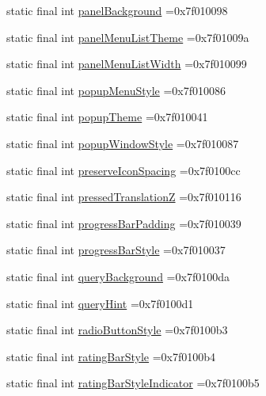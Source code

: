 \begin{DoxyCompactItemize}
static final int \hyperlink{classproject4_1_1xaria_1_1R_1_1attr_a49879ea588b3ac92fd5d8cbaed579fb3}{panel\+Background} =0x7f010098
\item 
static final int \hyperlink{classproject4_1_1xaria_1_1R_1_1attr_a8c926f3ce59f968aaa39ef0665562f9e}{panel\+Menu\+List\+Theme} =0x7f01009a
\item 
static final int \hyperlink{classproject4_1_1xaria_1_1R_1_1attr_acbeba7aa62e7528b101a89409abe2992}{panel\+Menu\+List\+Width} =0x7f010099
\item 
static final int \hyperlink{classproject4_1_1xaria_1_1R_1_1attr_afb866473cf6d66314b30642709afb1b5}{popup\+Menu\+Style} =0x7f010086
\item 
static final int \hyperlink{classproject4_1_1xaria_1_1R_1_1attr_a06bffca943d147734a40eb273589957d}{popup\+Theme} =0x7f010041
\item 
static final int \hyperlink{classproject4_1_1xaria_1_1R_1_1attr_a4fe6f821e3a9aba22e4cb5278fb94510}{popup\+Window\+Style} =0x7f010087
\item 
static final int \hyperlink{classproject4_1_1xaria_1_1R_1_1attr_a06451c64c4676512519c046c6f5e065b}{preserve\+Icon\+Spacing} =0x7f0100cc
\item 
static final int \hyperlink{classproject4_1_1xaria_1_1R_1_1attr_a572181f7a9e6b352ad203e9196c6a291}{pressed\+TranslationZ} =0x7f010116
\item 
static final int \hyperlink{classproject4_1_1xaria_1_1R_1_1attr_a371d550d06ea30a134c7549ea10a1718}{progress\+Bar\+Padding} =0x7f010039
\item 
static final int \hyperlink{classproject4_1_1xaria_1_1R_1_1attr_ad78b5154b765134ed406f888a1da6534}{progress\+Bar\+Style} =0x7f010037
\item 
static final int \hyperlink{classproject4_1_1xaria_1_1R_1_1attr_a84167c3d8a228a78b735c0f672d92e41}{query\+Background} =0x7f0100da
\item 
static final int \hyperlink{classproject4_1_1xaria_1_1R_1_1attr_ab087e93a83625f6b1721962d4c375609}{query\+Hint} =0x7f0100d1
\item 
static final int \hyperlink{classproject4_1_1xaria_1_1R_1_1attr_a34339d90503bd8a083f82ef72df0c319}{radio\+Button\+Style} =0x7f0100b3
\item 
static final int \hyperlink{classproject4_1_1xaria_1_1R_1_1attr_a33c3ad766e4d2d67648a41649dade84b}{rating\+Bar\+Style} =0x7f0100b4
\item 
static final int \hyperlink{classproject4_1_1xaria_1_1R_1_1attr_a887a061d845cdddf038ac47680cc0717}{rating\+Bar\+Style\+Indicator} =0x7f0100b5

\end{DoxyCompactItemize}
